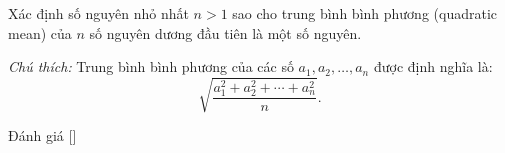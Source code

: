 \ifshowproblem
\begin{problem}\label{problem:THA-2015-TSTST-Q-P2}
    Xác định số nguyên nhỏ nhất \( n > 1 \) sao cho trung bình bình phương (quadratic mean) của \( n \) số nguyên dương đầu tiên là một số nguyên.

    \textit{Chú thích:} Trung bình bình phương của các số \( a_1, a_2, \ldots, a_n \) được định nghĩa là:
    \[
        \sqrt{\frac{a_1^2 + a_2^2 + \cdots + a_n^2}{n}}.
    \]
\end{problem}
\fi

\ifshowinfo
Đánh giá [\textbf{}]\footnotemark
{}
\fi